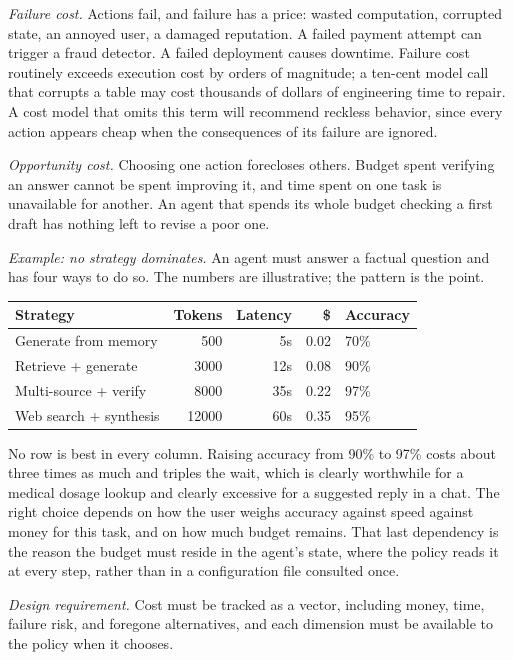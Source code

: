 \documentclass[11pt]{book}
\begin{document}
\textit{Failure cost.} Actions fail, and failure has a price: wasted computation, corrupted state, an annoyed user, a damaged reputation. A failed payment attempt can trigger a fraud detector. A failed deployment causes downtime. Failure cost routinely exceeds execution cost by orders of magnitude; a ten-cent model call that corrupts a table may cost thousands of dollars of engineering time to repair. A cost model that omits this term will recommend reckless behavior, since every action appears cheap when the consequences of its failure are ignored.

\textit{Opportunity cost.} Choosing one action forecloses others. Budget spent verifying an answer cannot be spent improving it, and time spent on one task is unavailable for another. An agent that spends its whole budget checking a first draft has nothing left to revise a poor one.

\textit{Example: no strategy dominates.} An agent must answer a factual question and has four ways to do so. The numbers are illustrative; the pattern is the point.

\begin{center}
\begin{tabular}{lrrrl}
\toprule
Strategy & Tokens & Latency & \$ & Accuracy \\
\midrule
Generate from memory & 500 & 5s & 0.02 & 70\% \\
Retrieve + generate & 3000 & 12s & 0.08 & 90\% \\
Multi-source + verify & 8000 & 35s & 0.22 & 97\% \\
Web search + synthesis & 12000 & 60s & 0.35 & 95\% \\
\bottomrule
\end{tabular}
\end{center}

No row is best in every column. Raising accuracy from 90\% to 97\% costs about three times as much and triples the wait, which is clearly worthwhile for a medical dosage lookup and clearly excessive for a suggested reply in a chat. The right choice depends on how the user weighs accuracy against speed against money for this task, and on how much budget remains. That last dependency is the reason the budget must reside in the agent's state, where the policy reads it at every step, rather than in a configuration file consulted once.

\textit{Design requirement.} Cost must be tracked as a vector, including money, time, failure risk, and foregone alternatives, and each dimension must be available to the policy when it chooses.
\end{document}
